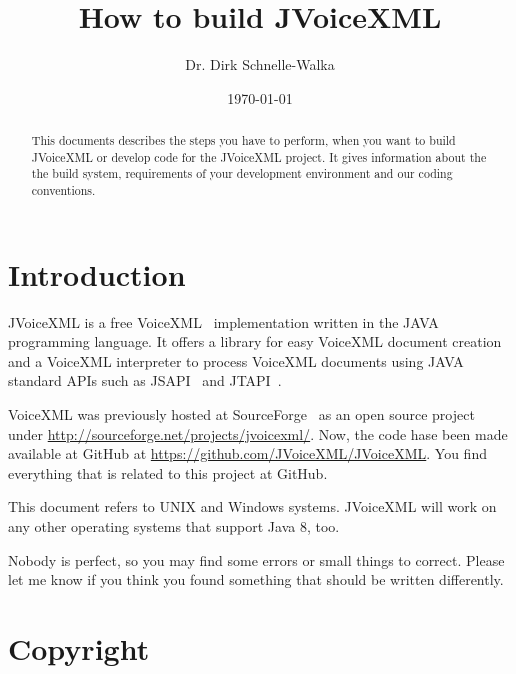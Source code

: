\documentclass[11pt,a4paper]{article}
\title{How to build JVoiceXML \jvxmlversion}
\author{Dr. Dirk Schnelle-Walka}
\date{\today}
\begin{document}
\pagestyle{empty}

\maketitle

\pagestyle{headings}

\tableofcontents

\newpage

\begin{abstract}
This documents describes the steps you have to perform, when you want
to build JVoiceXML or develop code for the JVoiceXML project. It gives
information about the the build system, requirements of your development environment 
and our coding conventions.
\end{abstract}

\section{Introduction}
\label{sec:introduction}

JVoiceXML is a free VoiceXML~\cite{w3.org:voicexml} implementation written in 
the JAVA programming language. It offers a library for easy VoiceXML
document creation and a VoiceXML interpreter to process 
VoiceXML documents using JAVA standard APIs such as JSAPI~\cite{sun:jsapi} and
JTAPI~\cite{sun:jsapi}.

VoiceXML was previously hosted at SourceForge~\cite{sourceforge} as an open source project
under \url{http://sourceforge.net/projects/jvoicexml/}. Now, the code hase been made
available at GitHub at \url{https://github.com/JVoiceXML/JVoiceXML}.
You find everything that is related to this project at GitHub.

This document refers to UNIX and Windows systems. JVoiceXML will work on
any other operating systems that support Java 8, too.

Nobody is perfect, so you may find some errors or small things to correct.
Please let me know if you think you found something that should be written
differently.

\section{Copyright}
\label{sec:copyright}
\end{document}

